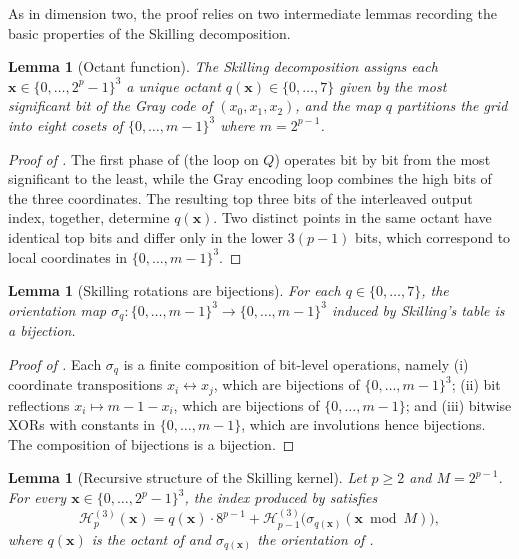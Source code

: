 \documentclass[11pt,a4paper]{article}
\theoremstyle{plain}
\newtheorem{lemma}[theorem]{Lemma}
\theoremstyle{definition}
\theoremstyle{remark}
\newcommand{\Hil}{\mathcal{H}}
\begin{document}
As in dimension two, the proof relies on two intermediate lemmas
recording the basic properties of the Skilling decomposition.

\begin{lemma}[Octant function]\label{lem:octant}
The Skilling decomposition assigns each
$\mathbf{x}\in\{0,\dots,2^p-1\}^3$ a unique octant
$q(\mathbf{x})\in\{0,\dots,7\}$ given by the most significant bit of the
Gray code of $(x_0,x_1,x_2)$, and the map $q$ partitions the grid into
eight cosets of $\{0,\dots,m-1\}^3$ where $m = 2^{p-1}$.
\end{lemma}

\begin{proof}[Proof of ]
The first phase of  (the loop on $Q$) operates
bit by bit from the most significant to the least, while the Gray
encoding loop combines the high bits of the three coordinates. The
resulting top three bits of the interleaved output index, together,
determine $q(\mathbf{x})$. Two distinct points in the same octant have
identical top bits and differ only in the lower $3(p-1)$ bits, which
correspond to local coordinates in $\{0,\dots,m-1\}^3$.
\end{proof}

\begin{lemma}[Skilling rotations are bijections]\label{lem:sigma}
For each $q\in\{0,\dots,7\}$, the orientation map
$\sigma_q:\{0,\dots,m-1\}^3\to \{0,\dots,m-1\}^3$ induced by Skilling's
table is a bijection.
\end{lemma}

\begin{proof}[Proof of ]
Each $\sigma_q$ is a finite composition of bit-level operations, namely
(i) coordinate transpositions $x_i \leftrightarrow x_j$, which are
bijections of $\{0,\dots,m-1\}^3$; (ii) bit reflections
$x_i \mapsto m-1-x_i$, which are bijections of $\{0,\dots,m-1\}$; and
(iii) bitwise XORs with constants in $\{0,\dots,m-1\}$, which are
involutions hence bijections. The composition of bijections is a
bijection.
\end{proof}

\begin{lemma}[Recursive structure of the Skilling kernel]
\label{lem:skilling_recursion}
Let $p\geq 2$ and $M = 2^{p-1}$. For every
$\mathbf{x}\in\{0,\dots,2^p-1\}^3$, the index produced by
 satisfies
\[
\Hil_p^{(3)}(\mathbf{x}) = q(\mathbf{x})\cdot 8^{p-1}
 + \Hil_{p-1}^{(3)}\bigl(\sigma_{q(\mathbf{x})}(\mathbf{x}\bmod M)\bigr),
\]
where $q(\mathbf{x})$ is the octant of  and
$\sigma_{q(\mathbf{x})}$ the orientation of .
\end{lemma}
\end{document}
